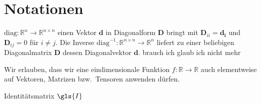 \section{Notationen}

$\text{diag} \colon \mathbb{R}^n \to \mathbb{R}^{n \times n}$ einen Vektor $\mathbf{d}$ in Diagonalform $\mathbf{D}$ bringt mit $\mathbf{D}_{ii} = \mathbf{d_i}$ und $\mathbf{D}_{ij} = 0$ für $i \neq j$.
Die Inverse $\text{diag}^{-1} \colon \mathbb{R}^{n \times n} \to \mathbb{R}^n$ liefert zu einer beliebigen Diagonalmatrix $\mathbf{D}$ dessen Diagonalvektor $\mathbf{d}$.
brauch ich glaub ich nicht mehr

Wir erlauben, dass wir eine eindimensionale Funktion $f \colon \mathbb{R} \to \mathbb{R}$ auch elementweise auf Vektoren, Matrizen bzw.\ Tensoren anwenden dürfen.

Identitätsmatrix $\gls{I}$

